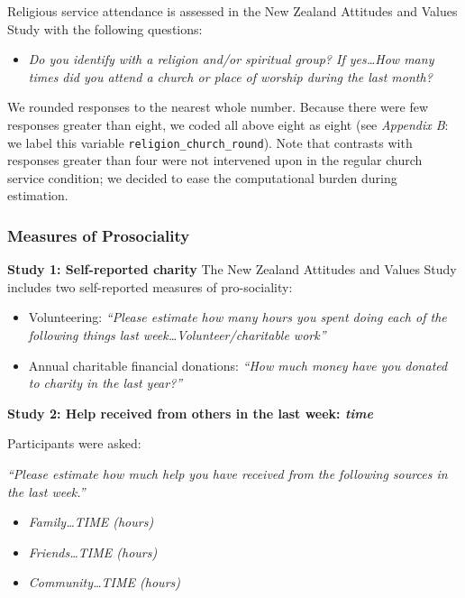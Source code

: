 \documentclass[
  single column]{article}
\providecommand{\tightlist}{%
  \setlength{\itemsep}{0pt}\setlength{\parskip}{0pt}}\usepackage{longtable,booktabs,array}
\begin{document}
Religious service attendance is assessed in the New Zealand Attitudes
and Values Study with the following questions:

\begin{itemize}
\tightlist
\item
  \emph{Do you identify with a religion and/or spiritual group? If
  yes\ldots How many times did you attend a church or place of worship
  during the last month?}
\end{itemize}

We rounded responses to the nearest whole number. Because there were few
responses greater than eight, we coded all above eight as eight (see
\emph{Appendix B}: we label this variable
\texttt{religion\_church\_round}). Note that contrasts with responses
greater than four were not intervened upon in the regular church service
condition; we decided to ease the computational burden during
estimation.

\subsubsection{Measures of Prosociality}\label{measures-of-prosociality}

\textbf{Study 1: Self-reported charity} The New Zealand Attitudes and
Values Study includes two self-reported measures of pro-sociality:

\begin{itemize}
\item
  Volunteering: \emph{``Please estimate how many hours you spent doing
  each of the following things last week\ldots Volunteer/charitable
  work''}
\item
  Annual charitable financial donations: \emph{``How much money have you
  donated to charity in the last year?''}
\end{itemize}

\textbf{Study 2: Help received from others in the last week: \emph{time}
}

Participants were asked:

\emph{``Please estimate how much help you have received from the
following sources in the last week.''}

\begin{itemize}
\tightlist
\item
  \emph{Family\ldots TIME (hours)}
\item
  \emph{Friends\ldots TIME (hours)}
\item
  \emph{Community\ldots TIME (hours)}
\end{itemize}
\end{document}

